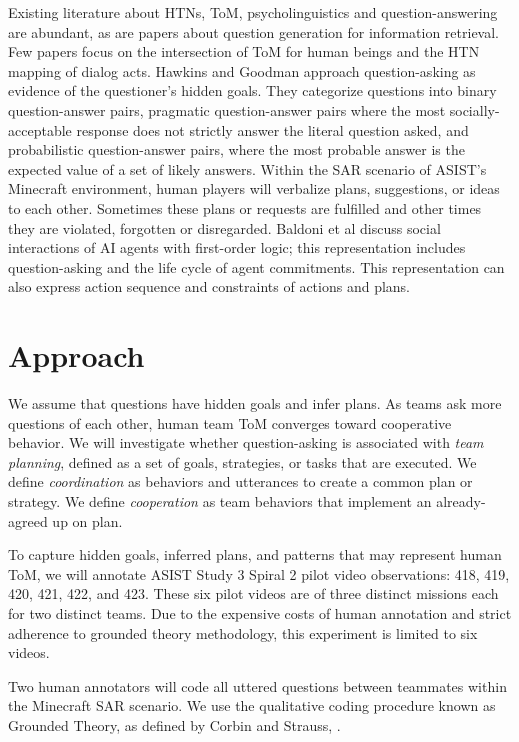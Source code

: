 \vspace{15pt}

Existing literature about HTNs, ToM, psycholinguistics and question-answering
are abundant, as are papers about question generation for information
retrieval. Few papers focus on the intersection of ToM for human beings and the HTN mapping of dialog acts. Hawkins and Goodman \citep{hawkins2017you} approach question-asking as evidence of the questioner’s hidden goals. They categorize questions into binary question-answer pairs, pragmatic question-answer pairs where the most socially-acceptable response does not strictly answer the literal question asked, and probabilistic question-answer pairs, where the most probable answer is the expected value of a set of likely answers. Within the SAR scenario of ASIST’s Minecraft environment, human players will
verbalize plans, suggestions, or ideas to each other. Sometimes these plans or
requests are fulfilled and other times they are violated, forgotten or
disregarded. Baldoni et al \citep{baldoni_2018} discuss social interactions
of AI agents with first-order logic; this representation includes
question-asking and the life cycle of agent commitments. This representation can also express action sequence and constraints of actions and plans.



\section{Approach}

We assume that questions have hidden goals and infer plans. As teams ask more questions of each other, human team ToM converges toward cooperative behavior.
We will investigate whether question-asking is associated with \textit{team
planning}, defined as a set of goals, strategies, or tasks that are executed.
We define \textit{coordination} as behaviors and utterances to create a common
plan or strategy. We define \textit{cooperation} as team behaviors that implement an already-agreed up on plan.

To capture hidden goals, inferred plans, and patterns that may represent human
ToM, we will annotate ASIST Study 3 Spiral 2 pilot video observations: 418, 419, 420, 421, 422, and 423.
These six pilot videos are of three distinct missions each for two distinct
teams. Due to the expensive costs of human annotation and strict adherence to grounded theory methodology, this experiment is limited to six videos. 

Two human annotators will code all uttered questions between teammates within the Minecraft SAR scenario.
We use the qualitative coding procedure known as Grounded Theory,
as defined by Corbin and Strauss, \citep{corbin_strauss_2015}. 

